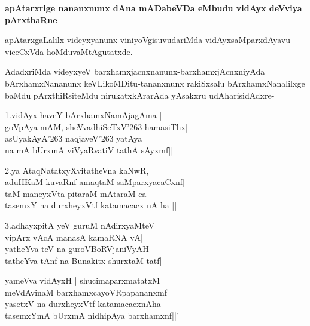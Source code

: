 \textbf{apAtarxrige nananxnunx dAna mADabeVDa eMbudu vidAyx deVviya pArxthaRne}

apAtarxgaLalilx videyxyanunx viniyoVgisuvudariMda vidAyxsaMparxdAyavu viceCxVda hoMduvaMtAgutatxde.

AdadxriMda videyxyeV barxhamxjacnxnanunx-barxhamxjAcnxniyAda bArxhamxNananunx keVLikoMDitu-tananxnunx rakiSxsalu bArxhamxNanalilxge baMdu pArxthiRsiteMdu nirukatxkArarAda yAsakxru udAharisidAdxre-

\begin{shloka}
1.\qquad vidAyx haveY bArxhamxNamAjagAma |\\
\qquad goVpAya mAM, sheVvadhiSeTxV\char'263 hamasiThx|\\
\qquad asUyakAyA\char'263 naqjaveV\char'263 yatAya\\
\qquad na mA bUrxmA viVyaRvatiV tathA sAyxmf||
\end{shloka}

\begin{shloka}
2.\qquad ya AtaqNatatxyXvitatheVna kaNwR,\\
aduHKaM kuvaRnf amaqtaM saMparxyacaCxnf|\\
taM maneyxVta pitaraM mAtaraM ca \\
tasemxY na durxheyxVtf katamacacx nA ha ||
\end{shloka}

\begin{shloka}
3.\qquad adhayxpitA yeV guruM nAdirxyaMteV\\
\qquad vipArx vAcA manasA kamaRNA vA|\\
\qquad yatheYva teV na guroVBoRVjaniVyAH\\
\qquad tatheYva tAnf na Bunakitx shurxtaM tatf||
\end{shloka}

\begin{shloka}
yameVva vidAyxH | shucimaparxmatatxM\\
meVdAvinaM barxhamxcayoVRpapananxmf\\
yasetxV na durxheyxVtf katamacacxnAha\\
tasemxYmA bUrxmA nidhipAya barxhamxnf||'
\end{shloka}

